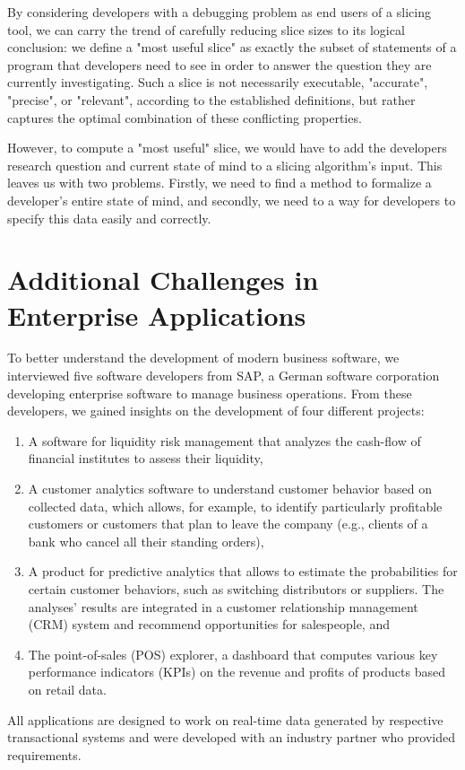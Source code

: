 By considering developers with a debugging problem as end users of a slicing tool, we can carry the trend of carefully reducing slice sizes to its logical conclusion: we define a "most useful slice" as exactly the subset of statements of a program that developers need to see in order to answer the question they are currently investigating.
Such a slice is not necessarily executable, "accurate", "precise", or "relevant", according to the established definitions, but rather captures the optimal combination of these conflicting properties.

However, to compute a "most useful" slice, we would have to add the developers research question and current state of mind to a slicing algorithm's input.
This leaves us with two problems.
Firstly, we need to find a method to formalize a developer's entire state of mind, and secondly, we need to a way for developers to specify this data easily and correctly.

\section{Additional Challenges in Enterprise Applications}
\label{sec:enterprise_applications}

\tmpStart
To better understand the development of modern business software, we interviewed five software developers from SAP, a German software corporation developing enterprise software to manage business operations.
From these developers, we gained insights on the development of four different projects:
\begin{enumerate}
	\item A software for liquidity risk management that analyzes the cash-flow of financial institutes to assess their liquidity,
	\item A customer analytics software to understand customer behavior based on collected data, which allows, for example, to identify particularly profitable customers or customers that plan to leave the company (e.g., clients of a bank who cancel all their standing orders),
	\item A product for predictive analytics that allows to estimate the probabilities for certain customer behaviors, such as switching distributors or suppliers. The analyses' results are integrated in a customer relationship management (CRM) system and recommend opportunities for salespeople, and
	\item The point-of-sales (POS) explorer, a dashboard that computes various key performance indicators (KPIs) on the revenue and profits of products based on retail data.
\end{enumerate}
%
All applications are designed to work on real-time data generated by respective transactional systems and were developed with an industry partner who provided requirements.

